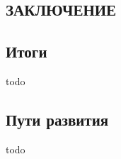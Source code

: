 \begin{center}
    \section*{ЗАКЛЮЧЕНИЕ}    
\end{center}

\subsection*{Итоги}
todo
\subsection*{Пути развития}
todo
\newpage